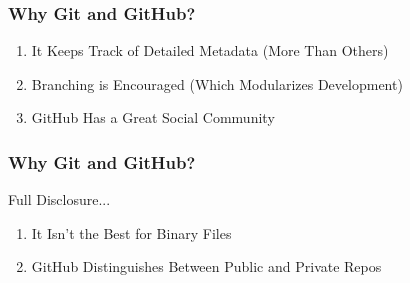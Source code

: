 \begin{frame}
\frametitle{\large{Why Git and GitHub?}}
\begin{enumerate}
\item It Keeps Track of Detailed Metadata (More Than Others)
\item Branching is Encouraged (Which Modularizes Development)
\item GitHub Has a Great Social Community
\end{enumerate}
\end{frame}

\begin{frame}
\frametitle{\large{Why Git and GitHub?}}
Full Disclosure...
\begin{enumerate}
\item It Isn't the Best for Binary Files
\item GitHub Distinguishes Between Public and Private Repos
\end{enumerate}
\end{frame}




\frame{
\frametitle{\large{}}
	\huge{\center{\color{RUBblau}{Thank you for your attention.}}}
}



